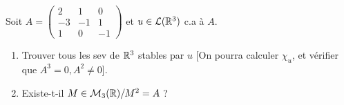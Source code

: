 
\begin{statementbox}
Soit $A = \begin{pmatrix} 2 & 1 & 0 \\ -3 & -1 & 1 \\ 1 & 0 & -1 \end{pmatrix}$ et $u \in \mathcal L(\mathbb R^3)$ c.a à $A$.
\begin{enumerate}[label=\alph*)]
  \item Trouver tous les sev de $\mathbb R^3$ stables par $u$ [On pourra calculer $\chi_u$, et vérifier que $A^3 = 0, A^2 \neq 0$].
  \item Existe-t-il $M \in \mathcal M_3(\mathbb R) / M^2 = A$ ?
\end{enumerate}
\end{statementbox}

